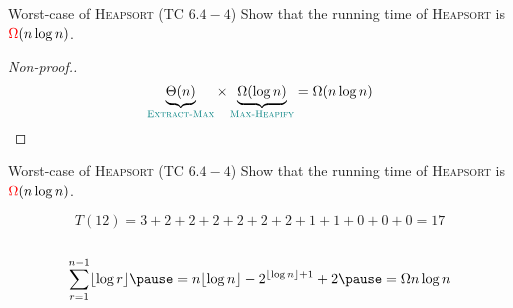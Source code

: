 \begin{frame}{}
  \begin{exampleblock}{Worst-case of \textsc{Heapsort} (TC $6.4-4$)}
    Show that the  running time of \textsc{Heapsort} is $\textcolor{red}{\Omega}(n \log n)$.
  \end{exampleblock}

  \pause
  \vspace{0.50cm}
  \centerline{}

  \pause
  \begin{proof}[Non-proof.]
    \[
      \underbrace{\Theta(n)}_{\textcolor{teal}{\textsc{Extract-Max}}} \times \underbrace{\Omega(\log n)}_{\textcolor{teal}{\textsc{Max-Heapify}}} = \Omega(n \log n)
    \]
  \end{proof}
\end{frame}

\begin{frame}{}
  \begin{exampleblock}{Worst-case of \textsc{Heapsort} (TC $6.4-4$)}
    Show that the  running time of \textsc{Heapsort} is $\textcolor{red}{\Omega}(n \log n)$.
  \end{exampleblock}

  \vspace{0.30cm}
\end{frame}

\begin{frame}{}
  \centerline{}

  \pause

  \pause

  \pause
  \vspace{-0.30cm}
  \[
    T(12) = 3 + 2 + 2 + 2 + 2 + 2 + 2 + 1 + 1 + 0 + 0 + 0 = 17
  \]
\end{frame}

\begin{frame}{}
  \begin{columns}
      \pause \centerline{\footnotesize {}}
    \pause
  \end{columns}

  \pause
  \vspace{0.60cm}
  \[
    \sum_{r=1}^{n-1} \lfloor \log r \rfloor \pause = n \lfloor \log  n \rfloor - 2^{\lfloor \log n \rfloor + 1} + 2 \pause = \Omega{n \log n}
  \]
\end{frame}

